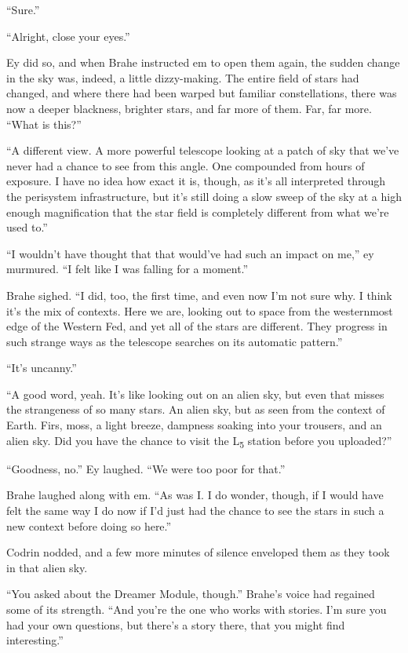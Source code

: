 ``Sure.''

``Alright, close your eyes.''

Ey did so, and when Brahe instructed em to open them again, the sudden change in the sky was, indeed, a little dizzy-making. The entire field of stars had changed, and where there had been warped but familiar constellations, there was now a deeper blackness, brighter stars, and far more of them. Far, far more. ``What is this?''

``A different view. A more powerful telescope looking at a patch of sky that we've never had a chance to see from this angle. One compounded from hours of exposure. I have no idea how exact it is, though, as it's all interpreted through the perisystem infrastructure, but it's still doing a slow sweep of the sky at a high enough magnification that the star field is completely different from what we're used to.''

``I wouldn't have thought that that would've had such an impact on me,'' ey murmured. ``I felt like I was falling for a moment.''

Brahe sighed. ``I did, too, the first time, and even now I'm not sure why. I think it's the mix of contexts. Here we are, looking out to space from the westernmost edge of the Western Fed, and yet all of the stars are different. They progress in such strange ways as the telescope searches on its automatic pattern.''

``It's uncanny.''

``A good word, yeah. It's like looking out on an alien sky, but even that misses the strangeness of so many stars. An alien sky, but as seen from the context of Earth. Firs, moss, a light breeze, dampness soaking into your trousers, and an alien sky. Did you have the chance to visit the L\textsubscript{5} station before you uploaded?''

``Goodness, no.'' Ey laughed. ``We were too poor for that.''

Brahe laughed along with em. ``As was I. I do wonder, though, if I would have felt the same way I do now if I'd just had the chance to see the stars in such a new context before doing so here.''

Codrin nodded, and a few more minutes of silence enveloped them as they took in that alien sky.

``You asked about the Dreamer Module, though.'' Brahe's voice had regained some of its strength. ``And you're the one who works with stories. I'm sure you had your own questions, but there's a story there, that you might find interesting.''

